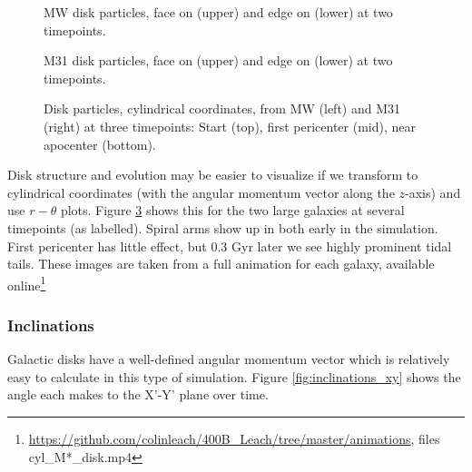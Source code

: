 \documentclass[twocolumn]{aastex63}
\begin{document}
\begin{figure}[ht!]
	\vspace{-7mm}
	\caption{MW disk particles, face on (upper) and edge on (lower) at two timepoints.
		\label{fig:MW_density_early}}
\end{figure}

\begin{figure}[ht!]
	\vspace{-7mm}
	\caption{M31 disk particles, face on (upper) and edge on (lower) at two timepoints.
		\label{fig:M31_density_early}}
\end{figure}


\begin{figure}[!bht]
	\vspace{-7mm}
	\vspace{-7mm}
	\vspace{-7mm}
	\caption{Disk particles, cylindrical coordinates, from MW (left) and M31 (right) at three timepoints: Start (top), first pericenter (mid), near apocenter (bottom).
		\label{fig:6cyl}}
\end{figure}

Disk structure and evolution may be easier to visualize if we transform to cylindrical coordinates (with the angular momentum vector along the $z$-axis) and use $r-\theta$ plots. Figure \ref{fig:6cyl} shows this for the two large galaxies at several timepoints (as labelled).  Spiral arms show up in both early in the simulation. First pericenter has little effect, but 0.3 Gyr later we see highly prominent tidal tails. These images are taken from a full animation for each galaxy, available online\footnote{\url{https://github.com/colinleach/400B_Leach/tree/master/animations}, files cyl\_M*\_disk.mp4 }

\subsubsection{Inclinations}

Galactic disks have a well-defined angular momentum vector which is relatively easy to calculate in this type of simulation. Figure \ref{fig:inclinations_xy} shows the angle each makes to the X'-Y' plane over time.
\end{document}
